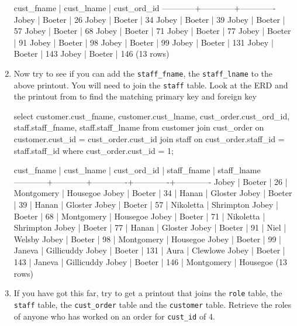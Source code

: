 \begin{enumerate}
\begin{pseudo*}
 cust_fname | cust_lname | cust_ord_id
------------+------------+-------------
 Jobey      | Boeter     |          26
 Jobey      | Boeter     |          34
 Jobey      | Boeter     |          39
 Jobey      | Boeter     |          57
 Jobey      | Boeter     |          68
 Jobey      | Boeter     |          71
 Jobey      | Boeter     |          77
 Jobey      | Boeter     |          91
 Jobey      | Boeter     |          98
 Jobey      | Boeter     |          99
 Jobey      | Boeter     |         131
 Jobey      | Boeter     |         143
 Jobey      | Boeter     |         146
(13 rows)
\end{pseudo*}
\item Now try to see if you can add the \verb|staff_fname|, the \verb|staff_lname| to the above printout. You will need to join the \verb|staff| table. Look at the ERD and the printout from  to find the matching primary key and foreign key
\begin{sql}
select customer.cust_fname, customer.cust_lname, cust_order.cust_ord_id, staff.staff_fname, staff.staff_lname from customer
join cust_order on customer.cust_id = cust_order.cust_id
join staff on cust_order.staff_id = staff.staff_id
where cust_order.cust_id = 1;
\end{sql}
\begin{pseudo*}
 cust_fname | cust_lname | cust_ord_id | staff_fname | staff_lname
------------+------------+-------------+-------------+-------------
 Jobey      | Boeter     |          26 | Montgomery  | Housegoe
 Jobey      | Boeter     |          34 | Hanan       | Gloster
 Jobey      | Boeter     |          39 | Hanan       | Gloster
 Jobey      | Boeter     |          57 | Nikoletta   | Shrimpton
 Jobey      | Boeter     |          68 | Montgomery  | Housegoe
 Jobey      | Boeter     |          71 | Nikoletta   | Shrimpton
 Jobey      | Boeter     |          77 | Hanan       | Gloster
 Jobey      | Boeter     |          91 | Niel        | Welsby
 Jobey      | Boeter     |          98 | Montgomery  | Housegoe
 Jobey      | Boeter     |          99 | Janeva      | Gillicuddy
 Jobey      | Boeter     |         131 | Aura        | Clewlowe
 Jobey      | Boeter     |         143 | Janeva      | Gillicuddy
 Jobey      | Boeter     |         146 | Montgomery  | Housegoe
(13 rows)
\end{pseudo*}
\item If you have got this far, try to get a printout that joins the \verb|role| table, the \verb|staff| table, the \verb|cust_order| table and the \verb|customer| table. Retrieve the roles of anyone who has worked on an order for \verb|cust_id| of 4.

\end{enumerate}
